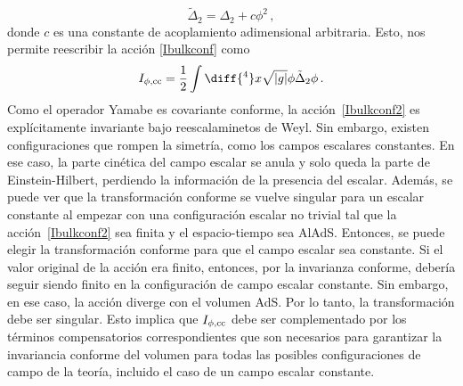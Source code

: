 \documentclass[../Main.tex]{subfiles}
\begin{document}
\begin{equation}
\tilde{\Delta}_{2} = \Delta_{2}+ c \phi^{2}\,,
\label{Yamabeext}
\end{equation}
donde $c$ es una constante de acoplamiento adimensional arbitraria. Esto, nos permite reescribir la acción \eqref{Ibulkconf} como 
\begin{equation}
I_{\phi,\rm cc}= \frac{1}{2}\int\diff{^4}x\sqrt{|g|} \phi \tilde{\Delta}_{2} \phi \,.
\label{Ibulkconf2}
\end{equation}
Como el operador Yamabe es covariante conforme, la acción~\eqref{Ibulkconf2} es explícitamente invariante bajo reescalaminetos de Weyl. Sin embargo, existen configuraciones que rompen la simetría, como los campos escalares constantes. En ese caso, la parte cinética del campo escalar se anula y solo queda la parte de Einstein-Hilbert, perdiendo la información de la presencia del escalar. Además, se puede ver que la transformación conforme se vuelve singular para un escalar constante al empezar con una configuración escalar no trivial tal que la acción~\eqref{Ibulkconf2} sea finita y el espacio-tiempo sea AlAdS. Entonces, se puede elegir la transformación conforme para que el campo escalar sea constante. Si el valor original de la acción era finito, entonces, por la invarianza conforme, debería seguir siendo finito en la configuración de campo escalar constante. Sin embargo, en ese caso, la acción diverge con el volumen AdS. Por lo tanto, la transformación debe ser singular. Esto implica que $I_{\phi,\rm cc}$ debe ser complementado por los términos compensatorios correspondientes que son necesarios para garantizar la invariancia conforme del volumen para todas las posibles configuraciones de campo de la teoría, incluido el caso de un campo escalar constante.
\end{document}
